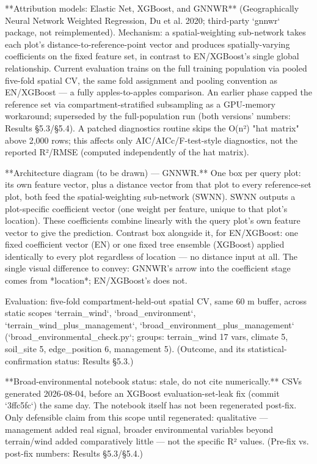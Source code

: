 \documentclass[11pt,a4paper]{report}
\begin{document}
**Attribution models: Elastic Net, XGBoost, and GNNWR** (Geographically Neural Network Weighted Regression, Du et al. 2020; third-party `gnnwr` package, not reimplemented). Mechanism: a spatial-weighting sub-network takes each plot's distance-to-reference-point vector and produces spatially-varying coefficients on the fixed feature set, in contrast to EN/XGBoost's single global relationship. Current evaluation trains on the full training population via pooled five-fold spatial CV, the same fold assignment and pooling convention as EN/XGBoost — a fully apples-to-apples comparison. An earlier phase capped the reference set via compartment-stratified subsampling as a GPU-memory workaround; superseded by the full-population run (both versions' numbers: Results §5.3/§5.4). A patched diagnostics routine skips the O(n²) "hat matrix" above 2,000 rows; this affects only AIC/AICc/F-test-style diagnostics, not the reported R²/RMSE (computed independently of the hat matrix).

**Architecture diagram (to be drawn) — GNNWR.** One box per query plot: its own feature vector, plus a distance vector from that plot to every reference-set plot, both feed the spatial-weighting sub-network (SWNN). SWNN outputs a plot-specific coefficient vector (one weight per feature, unique to that plot's location). These coefficients combine linearly with the query plot's own feature vector to give the prediction. Contrast box alongside it, for EN/XGBoost: one fixed coefficient vector (EN) or one fixed tree ensemble (XGBoost) applied identically to every plot regardless of location — no distance input at all. The single visual difference to convey: GNNWR's arrow into the coefficient stage comes from *location*; EN/XGBoost's does not.

Evaluation: five-fold compartment-held-out spatial CV, same 60 m buffer, across static scopes `terrain_wind`, `broad_environment`, `terrain_wind_plus_management`, `broad_environment_plus_management` (`broad_environmental_check.py`; groups: terrain_wind 17 vars, climate 5, soil_site 5, edge_position 6, management 5). (Outcome, and its statistical-confirmation status: Results §5.3.)

**Broad-environmental notebook status: stale, do not cite numerically.** CSVs generated 2026-08-04, before an XGBoost evaluation-set-leak fix (commit `3ffc5fc`) the same day. The notebook itself has not been regenerated post-fix. Only defensible claim from this scope until regenerated: qualitative — management added real signal, broader environmental variables beyond terrain/wind added comparatively little — not the specific R² values. (Pre-fix vs. post-fix numbers: Results §5.3/§5.4.)
\end{document}
